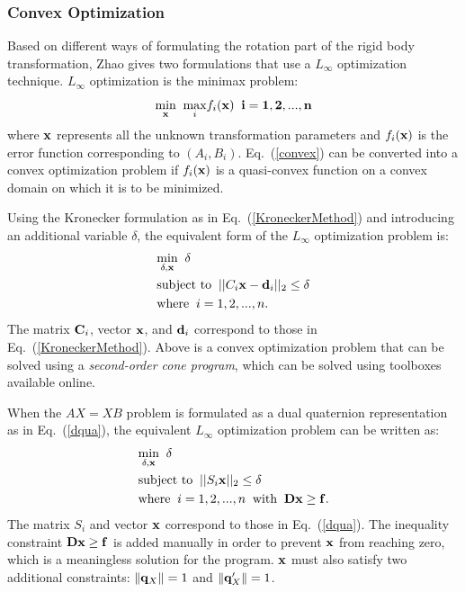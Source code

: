 \documentclass[twocolumn,10pt]{asme2ej}
\newcommand{\qq}{{\bf q}}
\newcommand{\xx}{{\bf x}}
\begin{document}
\subsubsection{Convex Optimization}
Based on different ways of formulating the rotation part of the rigid body transformation, Zhao \cite{zhao2011hand} gives two formulations that use a $L_\infty$ optimization technique. $L_\infty$ optimization is the minimax problem:
\begin{equation}
\underset{\bf x}{\text{min}} \; \; \underset{i}{\text{max}} f_{i}(\bf x) \; \; i = 1,2,... ,n
\label{convex}
\end{equation} 
where $\bf x$ represents all the unknown transformation parameters and $f_{i}(\xx)$ is the error function corresponding to $(A_i, B_i)$. Eq.~(\ref{convex}) can be converted into a convex optimization problem if $f_i(\bf x)$ is a quasi-convex function on a convex domain on which it is to be minimized.  

Using the Kronecker formulation as in Eq.~(\ref{KroneckerMethod}) and introducing an additional variable $\delta$, the equivalent form of the $L_\infty$ optimization problem is:
\begin{equation}
\begin{split}
&\underset{\delta, \xx}{\text{min}} \; \; \delta \\
&\text{subject to} \; \; ||C_i\xx - {\bf d}_i||_2 \leq \delta \\
&\text{where} \; \; i = 1,2,...,n.
\end{split}
\end{equation}
The matrix ${\bf C}_i$, vector $\bf x$, and ${\bf d}_i$ correspond to those in Eq.~(\ref{KroneckerMethod}).
Above is a convex optimization problem that can be solved using a \textit{second-order cone program}, which can be solved using toolboxes available online. 

When the $AX=XB$ problem is formulated as a dual quaternion representation as in Eq.~(\ref{dqua}), the equivalent $L_\infty$ optimization problem can be written as:
\begin{equation}
\begin{split}
&\underset{\delta, \xx}{\text{min}} \; \; \delta \\
&\text{subject to} \; \; ||S_i\xx||_2 \leq \delta \\
&\text{where} \; \; i = 1,2,...,n \; \; \text{with} \; \; \bf{Dx \geq f}.
\end{split}
\end{equation}
The matrix $S_i$ and vector $\bf x$ correspond to those in Eq.~(\ref{dqua}). 
The inequality constraint $\bf{Dx \geq f}$ is added manually in order to prevent $\xx$ from reaching zero, which is a meaningless solution for the program. $\bf x$ must also satisfy two additional constraints: $\|\qq_X\|=1$ and $\|\qq_{X}^{\prime}\|=1$. %
\end{document}

